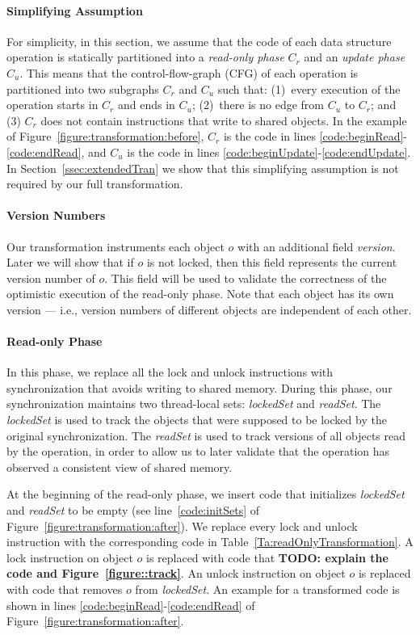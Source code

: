 \paragraph{Simplifying Assumption}
For simplicity, in this section, we assume that the code of each data structure operation is statically partitioned into a \emph{read-only phase} $C_r$ and an \emph{update phase} $C_u$.
This means that the control-flow-graph (CFG) of each operation is partitioned into two subgraphs $C_r$ and $C_u$ such that:
(1)~every execution of the operation starts in $C_r$ and ends in $C_u$; (2)~there is no edge from $C_u$ to  $C_r$;
and (3) $C_r$ does not contain instructions that write to shared objects.
%
In the example of Figure~\ref{figure:transformation:before}, $C_r$ is the code in lines \ref{code:beginRead}-\ref{code:endRead},
and $C_u$ is the code in lines \ref{code:beginUpdate}-\ref{code:endUpdate}.
%
In Section~\ref{ssec:extendedTran} we show that this simplifying assumption is not required by our full transformation.

\paragraph{Version Numbers}
Our transformation instruments each object $o$ with an additional field \emph{version}.
Later we will show that if $o$ is not locked, then this field  represents the current version number of $o$.
This field will be used to validate the correctness of the optimistic execution of the read-only phase.
Note that each object has its own version --- i.e., version numbers of different objects are independent of each other.

\paragraph{Read-only Phase}
In this phase, we replace all the lock and unlock instructions with synchronization that avoids writing to shared memory.
During this phase, our synchronization maintains two thread-local sets: \emph{lockedSet} and \emph{readSet}.
The \emph{lockedSet} is used to track the objects that were supposed to be locked by the original synchronization.
The \emph{readSet} is used to track versions of all objects read by the
operation, in order to allow us to later validate that the operation has observed a consistent view of shared memory.

At the beginning of the read-only phase, we insert code that initializes \emph{lockedSet} and \emph{readSet} to be empty (see  line~\ref{code:initSets} of Figure~\ref{figure:transformation:after}).
We replace every lock and unlock instruction with the corresponding code in Table~\ref{Ta:readOnlyTransformation}.
A lock instruction on object $o$ is replaced with code that \textbf{TODO: explain the code and Figure~\ref{figure::track}}.
An unlock instruction on object $o$ is replaced with code that removes $o$ from \emph{lockedSet}.
An example for a transformed code is shown in lines \ref{code:beginRead}-\ref{code:endRead} of Figure~\ref{figure:transformation:after}.

